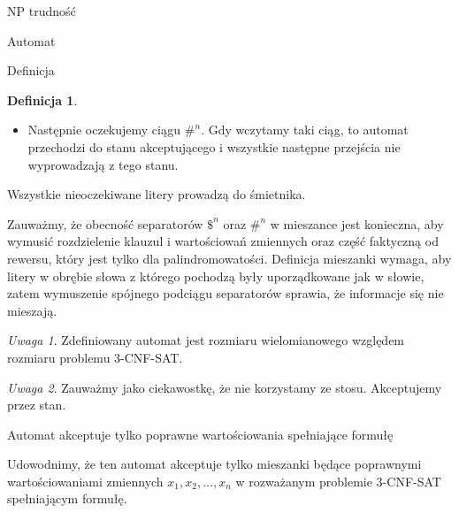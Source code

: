 \documentclass{article}
\theoremstyle{definition}
\newtheorem{definition}{Definicja}[section]
\theoremstyle{remark}
\newtheorem{remark}{Uwaga}[section]
\begin{document}
\begin{section}{NP trudność}
\begin{subsection}{Automat}
\begin{subsection}{Definicja}
\begin{definition}
\begin{itemize}
                       Przykładem poprawnego ciągu jest $x_1 x_1 x_2 \neg x_2 x_3 \neg x_3$ dla
                       wartościowania $x_1 = 1, x_2 = 0, x_3 = 0$ oraz $n = 3$. Jednakże ciąg $x_1 x_2
                           \neg x_2 x_3 \neg x_3$ nie jest poprawny, ponieważ występuje w nim zarówno
                       $x_2$ jak i $\neg x_2$, co nie jest poprawnym wartościowaniem zmiennych.

                 \item Następnie oczekujemy ciągu $ \#^n$. Gdy wczytamy taki ciąg, to automat
                       przechodzi do stanu akceptującego i wszystkie następne przejścia nie
                       wyprowadzają z tego stanu.

             \end{itemize}

             Wszystkie nieoczekiwane litery prowadzą do śmietnika.

             Zauważmy, że obecność separatorów $ \$^n $ oraz $ \#^n $ w mieszance jest
             konieczna, aby wymusić rozdzielenie klauzul i wartościowań zmiennych oraz część
             faktyczną od rewersu, który jest tylko dla palindromowatości. Definicja
             mieszanki wymaga, aby litery w obrębie słowa z którego pochodzą były
             uporządkowane jak w słowie, zatem wymuszenie spójnego podciągu separatorów
             sprawia, że informacje się nie mieszają.

         \end{definition}

         \begin{remark}
             Zdefiniowany automat jest rozmiaru wielomianowego względem rozmiaru problemu
             3-CNF-SAT.
         \end{remark}

         \begin{remark}
             Zauważmy jako ciekawostkę, że nie korzystamy ze stosu. Akceptujemy przez stan.
         \end{remark}

     \end{subsection}

     \begin{subsection}{Automat akceptuje tylko poprawne wartościowania spełniające formułę}

         Udowodnimy, że ten automat akceptuje tylko mieszanki będące poprawnymi
         wartościowaniami zmiennych $x_1, x_2, \ldots, x_n$ w rozważanym problemie
         3-CNF-SAT spełniającym formułę.


\end{subsection}
\end{subsection}
\end{section}
\end{document}
